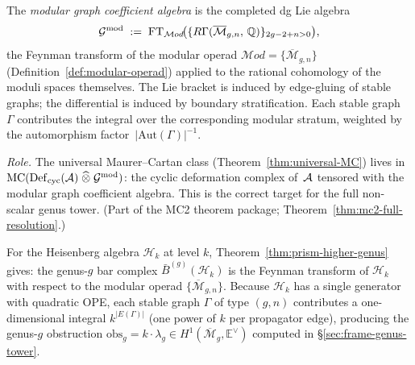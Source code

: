 \begin{definition}
\label{def:modular-graph-algebra}
The \emph{modular graph coefficient algebra} is the completed dg Lie
algebra
\begin{equation}\label{eq:gmod-def}
\mathcal{G}^{\mathrm{mod}}
\;:=\;
\mathrm{FT}_{\mathcal{M}od}\!\bigl(
  \{R\Gamma(\overline{\mathcal{M}}_{g,n},\, \mathbb{Q})\}_{2g-2+n>0}
\bigr),
\end{equation}
the Feynman transform of the modular operad
$\mathcal{M}od = \{\overline{\mathcal{M}}_{g,n}\}$
(Definition~\ref{def:modular-operad}) applied to the rational
cohomology of the moduli spaces themselves.  The Lie bracket is
induced by edge-gluing of stable graphs; the differential is induced
by boundary stratification.  Each stable graph~$\Gamma$ contributes
the integral over the corresponding modular stratum, weighted by the
automorphism factor~$|\mathrm{Aut}(\Gamma)|^{-1}$.

\smallskip\noindent
\emph{Role.}
The universal Maurer--Cartan class
(Theorem~\ref{thm:universal-MC}) lives in
$\operatorname{MC}(\operatorname{Def}_{\mathrm{cyc}}(\mathcal{A}) \;\widehat{\otimes}\; \mathcal{G}^{\mathrm{mod}})$:
the cyclic deformation complex of~$\mathcal{A}$ tensored with the modular
graph coefficient algebra.  This is the correct target for the
full non-scalar genus tower.
(Part of the MC2 theorem package; Theorem~\ref{thm:mc2-full-resolution}.)
\end{definition}

\begin{example}
For the Heisenberg algebra $\mathcal{H}_k$ at level $k$, Theorem~\ref{thm:prism-higher-genus} gives: the genus-$g$ bar complex $\bar{B}^{(g)}(\mathcal{H}_k)$ is the Feynman transform of $\mathcal{H}_k$ with respect to the modular operad $\{\overline{\mathcal{M}}_{g,n}\}$.  Because $\mathcal{H}_k$ has a single generator with quadratic OPE, each stable graph $\Gamma$ of type $(g,n)$ contributes a one-dimensional integral $k^{|E(\Gamma)|}$ (one power of $k$ per propagator edge), producing the genus-$g$ obstruction $\mathrm{obs}_g = k \cdot \lambda_g \in H^1(\overline{\mathcal{M}}_g, \mathbb{E}^\vee)$ computed in \S\ref{sec:frame-genus-tower}.
\end{example}

